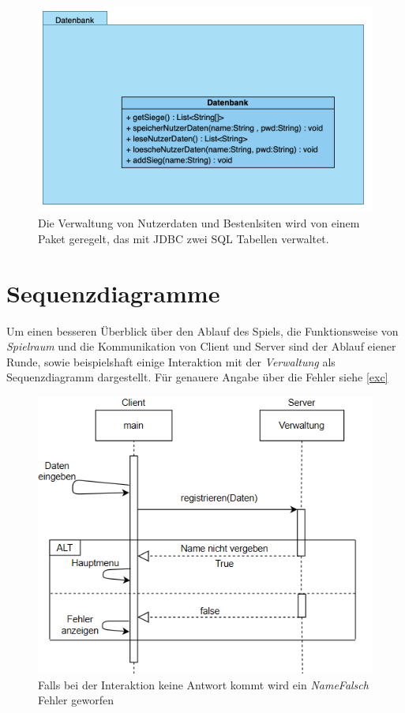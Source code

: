 \documentclass[11pt, a4paper, oneside]{memoir}                                                      %
\begin{document}
        \begin{figure}[h]
			\centering
			\includegraphics[scale=0.7]{../img/Klassen_Diagram/Datenbank.png}
            \caption{Die Verwaltung von Nutzerdaten und Bestenlsiten wird von einem Paket geregelt, das mit JDBC zwei SQL Tabellen verwaltet.}
        \end{figure} 
        
    \clearpage

    \section{Sequenzdiagramme} \label{sec:seq}
        Um einen besseren Überblick über den Ablauf des Spiels, die Funktionsweise von \textit{Spielraum} und die Kommunikation von Client und Server sind
        der Ablauf eiener Runde, sowie beispielshaft einige Interaktion mit der \textit{Verwaltung} als Sequenzdiagramm dargestellt.
        Für genauere Angabe über die Fehler siehe \ref{exc}

        \begin{figure}[h]
			\centering
			\includegraphics[scale=0.8]{../img/Sequenz_Diagramm/reg.png}
            \caption{Falls bei der Interaktion keine Antwort kommt wird ein \textit{NameFalsch} Fehler geworfen}
        \end{figure}
\end{document}
